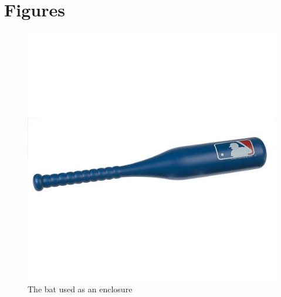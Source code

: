 \chapter{Figures}

\vspace*{-3in}

\begin{figure}[htp]
\begin{center}
\vspace{2.4in}
\includegraphics[scale = 0.5]{jumbo_bat.jpg}
\caption{The bat used as an enclosure}
\label{fig:jumbo_bat}
\end{center}
\end{figure}
\clearpage
\newpage

